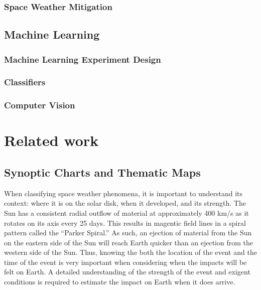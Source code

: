 \documentclass[twoside]{report}
\begin{document}
\subsection{Space Weather Mitigation}

\section{Machine Learning} \label{sec:ml}

\subsection{Machine Learning Experiment Design}

\subsection{Classifiers}

\subsection{Computer Vision}

\chapter{Related work} \label{ch:relatedwork}
\section{Synoptic Charts and Thematic Maps}
When classifying space weather phenomena, it is important to understand its context: where it is on the solar disk, when it developed, and its strength. The Sun has a consistent radial outflow of material at approximately 400 km/s as it rotates on its axis every 25 days. This results in magentic field lines in a spiral pattern called the ``Parker Spiral.'' As such, an ejection of material from the Sun on the eastern side of the Sun will reach Earth quicker than an ejection from the western side of the Sun.  Thus, knowing the both the location of the event and the time of the event is very important when considering when the impacts will be felt on Earth. A detailed understanding of the strength of the event and exigent conditions is required to estimate the impact on Earth when it does arrive.
\end{document}
